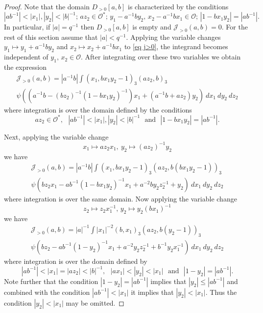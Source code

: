 \documentclass[10pt,a4paper]{amsart}
\newcommand{\J}{\mathcal{J}}
\newcommand{\abs}[1]{\left|{#1}\right|}
\renewcommand{\O}{\mathcal{O}}
\begin{document}
\begin{proof}
Note that the domain $D_{>0}[a,b]$ is characterized by the conditions
\[
\abs{ab^{-1}}<\abs{x_1},\abs{y_2}<\abs{b}^{-1};\, az_2\in \O^*;\, y_1-a^{-1}by_2,\,x_2-a^{-1}bx_1\in \O;\, \abs{1-bx_1y_2}=\abs{ab^{-1}}.
\]
In particular, if $\abs{a}=q^{-1}$ then $D_{>0}[a,b]$ is empty and $\J_{>0}(a,b)=0$. For the rest of this section assume that $\abs{a}<q^{-1}$.
Applying the variable changes $y_1\mapsto y_1+a^{-1}by_2$ and $x_2\mapsto x_2+a^{-1}bx_1$ to \eqref{eq j>0},
the integrand becomes independent of $y_1,\,x_2\in\O$. After integrating over these two variables we obtain the expression
\begin{multline*}
\J_{>0}(a,b)=\abs{a^{-1}b}\int (x_1,bx_1y_2-1)_3  (az_2,b)_3\\
 \psi((a^{-1}b-(b z_2)^{-1}(1-bx_1y_2)^{-1})x_1+(a^{-1}b+az_2)y_2)\ dx_1\ dy_2\ dz_2
\end{multline*}
where integration is over the domain defined by the conditions
\[
az_2\in\O^*,\ \ \ \abs{ab^{-1}}<\abs{x_1},\abs{y_2}<\abs{b}^{-1}\ \ \  \text{and} \ \ \ \abs{1-bx_1y_2}=\abs{ab^{-1}}. 
\]

Next, applying the variable change 
\[
x_1\mapsto az_2x_1, \ y_2\mapsto (az_2)^{-1}y_2
\]
we have
\begin{multline*}
\J_{>0}(a,b)=\abs{a^{-1}b}\int (x_1,bx_1y_2-1)_3  (az_2,b(bx_1y_2-1))_3 \\ \psi(bz_2x_1-ab^{-1}(1-bx_1y_2)^{-1}x_1+a^{-2}by_2z_2^{-1}+y_2)\ dx_1\ dy_2\ dz_2
\end{multline*}
where integration is over the same domain.
Now applying the variable change 
\[
z_2\mapsto z_2x_1^{-1},\,y_2\mapsto y_2(bx_1)^{-1}
\]
we have
\begin{multline*}
\J_{>0}(a,b)=\abs{a}^{-1}\int \abs{x_1}^{-2}(b,x_1)_3  (az_2,b(y_2-1))_3 \\ \psi(bz_2-ab^{-1}(1-y_2)^{-1}x_1+a^{-2}y_2z_2^{-1}+b^{-1}y_2x_1^{-1})\ dx_1\ dy_2\ dz_2
\end{multline*}
where integration is over the domain defined by
\[
\abs{ab^{-1}}<\abs{x_1}=\abs{az_2}<\abs{b}^{-1},\ \ \ \abs{ax_1}<\abs{y_2}<\abs{x_1}\ \ \  \text{and} \ \ \ \abs{1-y_2}=\abs{ab^{-1}}. 
\]
Note further that the condition $\abs{1-y_2}=\abs{ab^{-1}}$ implies that $\abs{y_2}\le \abs{ab^{-1}}$ and combined with the condition $\abs{ab^{-1}}<\abs{x_1}$ it 
implies that $\abs{y_2}<\abs{x_1}$. Thus the condition $\abs{y_2}<\abs{x_1}$ may be omitted.


\end{proof}
\end{document}
